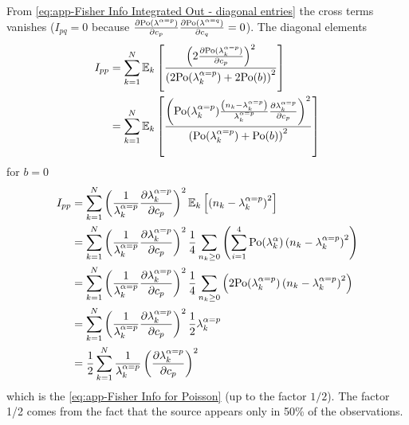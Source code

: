 From \autoref{eq:app-Fisher Info Integrated Out - diagonal entries} the cross terms vanishes ($I_{pq}=0$ because $\frac{\partial\mathrm{Po}(\lambda^{\alpha=p})}{\partial c_p}\frac{\partial\mathrm{Po}(\lambda^{\alpha=q})}{\partial c_{q}}=0$). The diagonal elements 
%
\begin{alignat*}{1}
	I_{pp} & =\sum_{k=1}^N\mathbb{E}_k\left[\frac{\left(2\frac{\partial\mathrm{Po}(\lambda_k^{\alpha=p})}{\partial c_p}\right)^2}{\left(2\mathrm{Po}(\lambda_k^{\alpha=p})+2\mathrm{Po}(b)\right)^2}\right]\\
 	& =\sum_{k=1}^N\mathbb{E}_k\left[\frac{\left(\mathrm{Po}(\lambda_k^{\alpha=p})\frac{\left(n_k-\lambda_k^{\alpha=p}\right)}{\lambda_k^{\alpha=p}}\frac{\partial\lambda_k^{\alpha=p}}{\partial c_p}\right)^2}{\left(\mathrm{Po}(\lambda_k^{\alpha=p})+\mathrm{Po}(b)\right)^2}\right]
\end{alignat*}
%
for $b=0$
%
\begin{alignat*}{1}
	I_{pp} 
	 &=\sum_{k=1}^N\left(\frac{1}{\lambda_k^{\alpha=p}}\frac{\partial\lambda_k^{\alpha=p}}{\partial c_p}\right)^2\mathbb{E}_k\left[\left(n_k-\lambda_k^{\alpha=p}\right)^2\right]\\
 	& =\sum_{k=1}^N\left(\frac{1}{\lambda_k^{\alpha=p}}\frac{\partial\lambda_k^{\alpha=p}}{\partial c_p}\right)^2\frac{1}{4}\sum_{n_k\geq0}\left(\sum_{i=1}^4\mathrm{Po}(\lambda_k^\alpha)\left(n_k-\lambda_k^{\alpha=p}\right)^2\right)\\
 	& =\sum_{k=1}^N\left(\frac{1}{\lambda_k^{\alpha=p}}\frac{\partial\lambda_k^{\alpha=p}}{\partial c_p}\right)^2\frac{1}{4}\sum_{n_k\geq0}\left(2\mathrm{Po}(\lambda_k^{\alpha=p})\left(n_k-\lambda_k^{\alpha=p}\right)^2\right)\\
 	& =\sum_{k=1}^N\left(\frac{1}{\lambda_k^{\alpha=p}}\frac{\partial\lambda_k^{\alpha=p}}{\partial c_p}\right)^2\frac{1}{2}\lambda_k^{\alpha=p}\\
 	& =\frac{1}{2}\sum_{k=1}^N\frac{1}{\lambda_k^{\alpha=p}}\left(\frac{\partial\lambda_k^{\alpha=p}}{\partial c_p}\right)^2
\end{alignat*}
%
which is the \autoref{eq:app-Fisher Info for Poisson} (up to the factor $1/2$). The factor 1/2 comes from the fact that the source appears only in 50\% of the observations.

